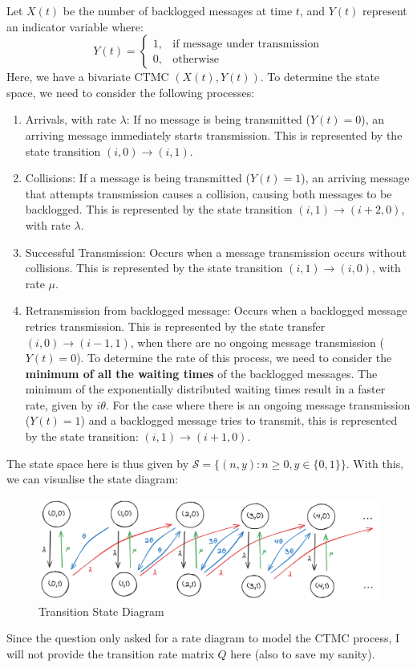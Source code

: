 \documentclass[12pt]{article}
\begin{document}
Let $X(t)$ be the number of backlogged messages at time $t$, and $Y(t)$ represent an indicator variable where: \begin{equation}
    Y(t) = \begin{cases}
        1, & \text{if message under transmission} \\ 
        0, & \text{otherwise}
    \end{cases}
\end{equation} Here, we have a bivariate CTMC $\left( X(t), Y(t) \right)$. To determine the state space, we need to consider the following processes: \begin{enumerate}
    \item Arrivals, with rate $\lambda$: If no message is being transmitted ($Y(t) = 0$), an arriving message immediately starts transmission. This is represented by the state transition $(i,0) \to (i,1)$.
    \item Collisions: If a message is being transmitted ($Y(t) = 1$), an arriving message that attempts transmission causes a collision, causing both messages to be backlogged. This is represented by the state transition $(i,1) \to (i+2,0)$, with rate $\lambda$. 
    \item Successful Transmission: Occurs when a message transmission occurs without collisions. This is represented by the state transition $(i,1) \to (i,0)$, with rate $\mu$. 
    \item Retransmission from backlogged message: Occurs when a backlogged message retries transmission. This is represented by the state transfer $(i,0) \to (i-1, 1)$, when there are no ongoing message transmission ($Y(t) = 0$). To determine the rate of this process, we need to consider the \textbf{minimum of all the waiting times} of the backlogged messages. The minimum of the exponentially distributed waiting times result in a faster rate, given by $i\theta$. For the case where there is an ongoing message transmission ($Y(t) = 1$) and a backlogged message tries to transmit, this is represented by the state transition: $(i,1) \to (i+1,0)$.
\end{enumerate} The state space here is thus given by $\mathcal{S} = \{(n,y): n \geq 0, y \in \{0,1\}\}$. With this, we can visualise the state diagram:

\begin{figure}[H]
    \centering
    \includegraphics[width=\textwidth]{Images/Q5.png}
    \caption{Transition State Diagram}
    \label{fig:5-tsd}
\end{figure} 

\noindent Since the question only asked for a rate diagram to model the CTMC process, I will not provide the transition rate matrix $Q$ here (also to save my sanity). 
\end{document}
